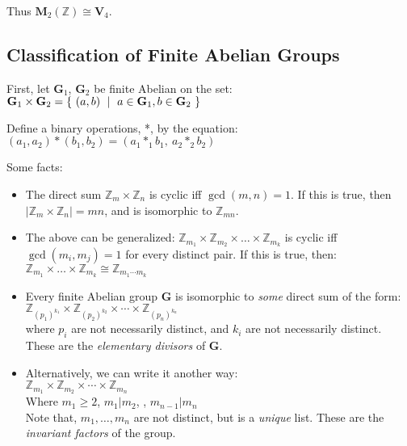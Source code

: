 \documentclass{article}
\begin{document}
  Thus $\mathbf{M}_2(\mathbb{Z}) \cong \mathbf{V}_4$.


  \subsection{Classification of Finite Abelian Groups}

  First, let $\mathbf{G}_1$, $\mathbf{G}_2$ be finite Abelian on the set:\\
  $\mathbf{G}_1 \times \mathbf{G}_2 = \{\ (a, b)\ \mid\ a \in \mathbf{G}_1, b \in \mathbf{G}_2\ \}$

  Define a binary operations, *, by the equation:\\
    $(a_1, a_2) * (b_1, b_2) = (a_1 *_1 b_1,\ a_2 *_2 b_2)$

  Some facts:
  \begin{itemize}
    \item
      The direct sum $\mathbb{Z}_m \times \mathbb{Z}_n$ is cyclic iff
      $\gcd(m, n) = 1$. If this is true, then
      $|\mathbb{Z}_m \times \mathbb{Z}_n| = m n$, and is isomorphic to $\mathbb{Z}_{mn}$.

    \item 
      The above can be generalized:
      $\mathbb{Z}_{m_1} \times \mathbb{Z}_{m_2} \times \dotso \times \mathbb{Z}_{m_k}$
      is cyclic iff $\gcd(m_i, m_j) = 1$ for every distinct pair. If this is
      true, then:
      $\mathbb{Z}_{m_1} \times \dots \times \mathbb{Z}_{m_k} \cong \mathbb{Z}_{m_1 \dotsm m_k}$

    \item 
      Every finite Abelian group $\mathbf{G}$ is isomorphic to \emph{some}
      direct sum of the form: \\
      $\mathbb{Z}_{(p_1)^{k_1}} \times \mathbb{Z}_{(p_2)^{k_2}} \times \dotsm \times \mathbb{Z}_{(p_n)^{k_n}}$ \\
      where $p_i$ are not necessarily distinct, and $k_i$ are not necessarily
      distinct. These are the \emph{elementary divisors} of $\mathbf{G}$.

    \item
      Alternatively, we can write it another way:\\
      $\mathbb{Z}_{m_1} \times \mathbb{Z}_{m_2} \times \dotsm \times \mathbb{Z}_{m_n}$\\
      Where $m_1 \geq 2$, $m_1 | m_2$, \dotso, $m_{n-1} | m_n$ \\
      Note that, $m_1, \dots, m_n$ are not distinct, but is a \emph{unique} list.
      These are the \emph{invariant factors} of the group.
  \end{itemize}
\end{document}
